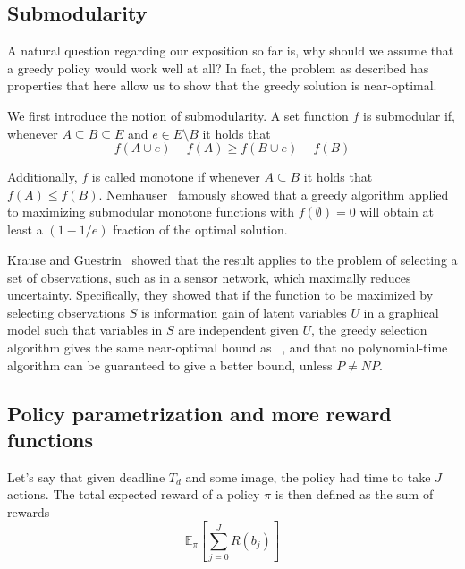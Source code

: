 \documentclass[runningheads]{llncs}
\begin{document}
\subsection{Submodularity} \label{sec:submodularity}
A natural question regarding our exposition so far is, why should we assume that a greedy policy would work well at all?
In fact, the problem as described has properties that here allow us to show that the greedy solution is near-optimal.

We first introduce the notion of submodularity.
A set function $f$ is submodular if, whenever $A \subseteq B \subseteq E$ and $e \in E \setminus B$ it holds that
\begin{equation}
f(A \cup {e}) - f(A) \geq f(B \cup {e}) - f(B)
\end{equation}

Additionally, $f$ is called monotone if whenever $A \subseteq B$ it holds that $f(A) \leq f(B)$.
Nemhauser~\cite{Nemhauser1978} famously showed that a greedy algorithm applied to maximizing submodular monotone functions with $f(\emptyset)=0$ will obtain at least a $(1-1/e)$ fraction of the optimal solution.

Krause and Guestrin~\cite{Krause2005a} showed that the result applies to the problem of selecting a set of observations, such as in a sensor network, which maximally reduces uncertainty.
Specifically, they showed that if the function to be maximized by selecting observations $S$ is information gain of latent variables $U$ in a graphical model such that variables in $S$ are independent given $U$, the greedy selection algorithm gives the same near-optimal bound as  ~\cite{Nemhauser1978}, and that no polynomial-time algorithm can be guaranteed to give a better bound, unless $P \neq NP$.


\subsection{Policy parametrization and more reward functions}

Let's say that given deadline $T_d$ and some image, the policy had time to take $J$ actions.
The total expected reward of a policy $\pi$ is then defined as the sum of rewards
\begin{equation}
\mathbb{E}_\pi[\sum_{j=0}^J R(b_j)]
\end{equation}
\end{document}

